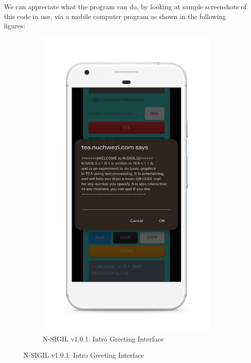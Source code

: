 \documentclass[a4paper, 18pt]{book} %
\begin{document}
We can appreciate what the program can do, by looking at sample screenshots of this code in use, via a mobile computer program as shown in the following figures:

\begin{figure}[H]
  \centering
  \begin{subfigure}[b]{0.45\textwidth}
    \includegraphics[width=\textwidth]{resources/images/nsigil_intro.png}
    \caption{N-SIGIL v1.0.1: Intro Greeting Interface}
    \label{FIGNSIGIL}
  \end{subfigure}

\end{figure}
\end{document}

